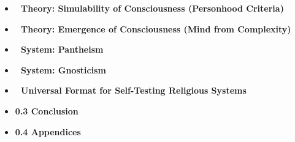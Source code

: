 \documentclass[12pt]{article}
\begin{document}
\begin{itemize}
\item \textbf{🔷 Theory: Simulability of Consciousness (Personhood Criteria)}

\item \textbf{🔷 Theory: Emergence of Consciousness (Mind from Complexity)}

\item \textbf{🔷 System: Pantheism}

\item \textbf{🔷 System: Gnosticism}

\item \textbf{🔷 Universal Format for Self-Testing Religious Systems}

\item \textbf{0.3 Conclusion}

\item \textbf{0.4 Appendices}

\end{itemize}
\end{document}
